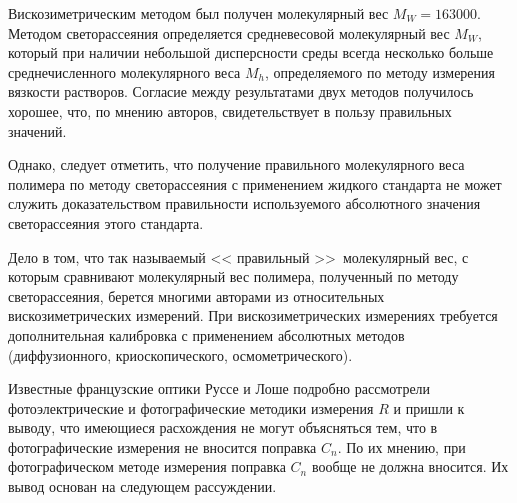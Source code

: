 Вискозиметрическим методом был получен молекулярный вес
$M_W=163000$. Методом светорассеяния определяется средневесовой
молекулярный вес $M_W$, который при наличии небольшой
дисперсности среды всегда несколько больше среднечисленного
молекулярного веса $M_h$, определяемого по методу измерения
вязкости растворов. Согласие между результатами двух методов
получилось хорошее, что, по мнению авторов, свидетельствует в
пользу правильных значений.

Однако, следует отметить, что получение правильного молекулярного
веса полимера по методу светорассеяния с применением жидкого
стандарта не может служить доказательством правильности
используемого абсолютного значения светорассеяния этого
стандарта.

Дело в том, что так называемый << правильный >>\ молекулярный
вес, с которым сравнивают молекулярный вес полимера, полученный
по методу светорассеяния, берется многими авторами из
относительных вискозиметрических измерений. При
вискозиметрических измерениях требуется дополнительная калибровка
с применением абсолютных методов (диффузионного,
криоскопического, осмометрического).



Известные французские оптики Руссе и Лоше подробно рассмотрели фотоэлектрические и фотографические методики измерения $R$ и пришли к выводу, что имеющиеся расхождения не могут объясняться тем, что в фотографические измерения не вносится поправка $C_n$. По их мнению, при фотографическом методе измерения поправка $C_n$ вообще не должна вносится. Их вывод основан на следующем рассуждении. 

